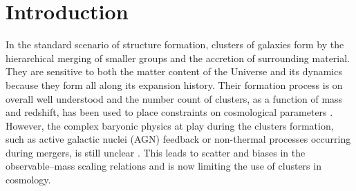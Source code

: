 \documentclass[twocolumn,traditabstract]{aa}
\begin{document}
\maketitle
\tableofcontents

\section{Introduction}\label{sec:Introduction}
In the standard scenario of structure formation, clusters of galaxies form by the hierarchical merging of smaller groups and the accretion of surrounding material. They are sensitive to both the matter content of the Universe and its dynamics because they form all along its expansion history. Their formation process is on overall well understood and the number count of clusters, as a function of mass and redshift, has been used to place constraints on cosmological parameters \citep[e.g.][]{planck2013cluster_count}. However, the complex baryonic physics at play during the clusters formation, such as active galactic nuclei (AGN) feedback or non-thermal processes occurring during mergers, is still unclear \citep[see for example][]{borgani2011}. This leads to scatter and biases in the observable--mass scaling relations and is now limiting the use of clusters in cosmology.
\end{document}
